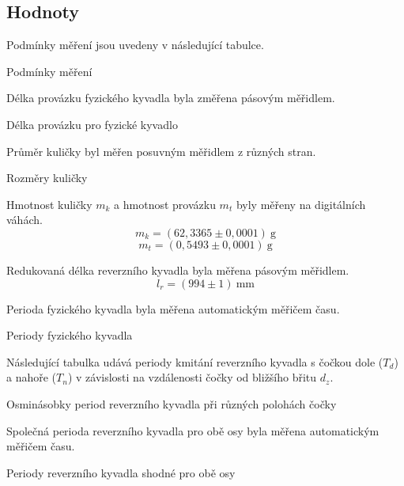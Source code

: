 \documentclass[protokol.tex]{subfiles}
\begin{document}
\subsection*{Hodnoty}
Podmínky měření jsou uvedeny v následující tabulce.
\begin{table}[H] \label{tab:podminky}
\centering
\setlength{\tabcolsep}{10pt}

\caption{Podmínky měření}
\end{table}

Délka provázku fyzického kyvadla byla změřena pásovým měřidlem.
\begin{table}[H] 
\centering
\setlength{\tabcolsep}{10pt}

\caption{Délka provázku pro fyzické kyvadlo}
\label{tab:delka_provazku}
\end{table}

\newpage

Průměr kuličky byl měřen posuvným měřidlem z různých stran.
\begin{table}[H] 
\centering
\setlength{\tabcolsep}{10pt}

\caption{Rozměry kuličky}
\label{tab:rozmer_kulicky}
\end{table}

Hmotnost kuličky $m_k$ a hmotnost provázku $m_t$ byly měřeny na digitálních váhách.
$$ m_k = (62,3365 \pm 0,0001) \ \si{\gram} $$
$$ m_t = (0,5493  \pm 0,0001) \ \si{\gram} $$

Redukovaná délka reverzního kyvadla byla měřena pásovým měřidlem.
$$ l_r = (994 \pm 1) \ \si{\milli\metre} $$

Perioda fyzického kyvadla byla měřena automatickým měřičem času.
\begin{table}[H] 
\centering
\setlength{\tabcolsep}{20pt}

\caption{Periody fyzického kyvadla}
\label{tab:periody_fyz_kyv}
\end{table}

\newpage

Následující tabulka udává periody kmitání reverzního kyvadla s čočkou dole ($T_d$) a nahoře ($T_n$) v závislosti na vzdálenosti čočky od bližšího břitu $d_z$.
\begin{table}[H] 
\centering
\setlength{\tabcolsep}{10pt}

\caption{Osminásobky period reverzního kyvadla při různých polohách čočky}
\label{tab:periody_rev_kyv}
\end{table}

Společná perioda reverzního kyvadla pro obě osy byla měřena automatickým měřičem času.
\begin{table}[H] 
\centering
\setlength{\tabcolsep}{10pt}

\caption{Periody reverzního kyvadla shodné pro obě osy}
\label{tab:periody_rev_kyv_2}
\end{table}
\end{document}
